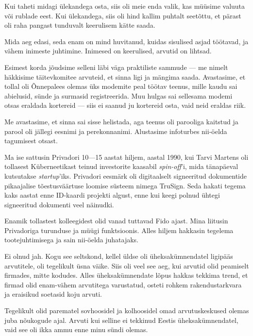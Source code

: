 
Kui taheti midagi ülekandega osta, siis oli meie enda valik, kas 
müüsime valuuta või rublade eest. Kui ülekandega, 
siis oli hind kallim puhtalt seetõttu, et pärast oli raha pangast tunduvalt keerulisem kätte saada.


Mida aeg edasi, seda enam on mind 
huvitanud, kuidas sisulised asjad töötavad, ja vähem 
inimeste juhtimine. Inimesed on keerulised, arvutid on 
lihtsad.


Esimest korda jõudsime selleni läbi väga praktiliste sammude --- me nimelt häkkisime 
täitevkomitee arvuteid, et sinna ligi ja mängima saada. 
Avastasime, et tollal oli Õnnepalees olemas üks modemite peal 
töötav teenus, mille kaudu sai abielusid, sünde ja surmasid registreerida. Muu hulgas sai sellesama 
modemi otsas eraldada kortereid --- siis ei saanud ju kortereid osta, 
vaid neid eraldas riik.


Me avastasime, et sinna sai sisse helistada, aga teenus oli parooliga kaitstud 
ja parool oli jällegi eesnimi ja perekonnanimi. Alustasime infoturbes nii-öelda 
tagumisest otsast.

Ma ise sattusin Privadori 10---15 aastat hiljem, 
aastal 1990, kui Tarvi Martens oli tollasest Küberneetikast teinud 
investorite kaasabil \emph{spin-off}'i, 
mida tänapäeval kutsutakse \emph{startup}'iks. Privadori eesmärk oli 
digitaalselt signeeritud dokumentide pikaajalise tõestusväärtuse loomise 
süsteem nimega TruSign. Seda hakati tegema kaks aastat enne ID-kaardi 
projekti algust, enne kui keegi polnud ühtegi signeeritud dokumenti veel näinudki.


Enamik tollastest kolleegidest olid vanad tuttavad Fido ajast. Mina liitusin Privadoriga 
turunduse ja müügi funktsioonis. Alles hiljem hakkasin tegelema
tootejuhtimisega ja sain nii-öelda juhatajaks. 


Ei olnud jah. Kogu see seltskond, kellel üldse oli üheksakümnendatel 
ligipääs arvutitele, oli tegelikult üsna väike. Siis oli veel see aeg, kui arvutid olid 
peamiselt firmades, mitte kodudes. Alles üheksakümnendate lõpus hakkas 
tekkima trend, et firmad olid enam-vähem arvutitega varustatud, osteti
rohkem rakendustarkvara ja eraisikud soetasid koju arvuti.

Tegelikult olid parematel sovhoosidel ja kolhoosidel omad 
arvutuskeskused olemas juba nõukogude ajal. Arvuti kui selline ei 
tekkinud Eestis üheksakümnendatel, vaid see oli ikka ammu enne minu sündi 
olemas.
